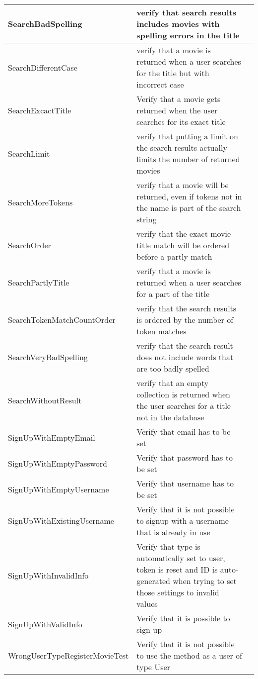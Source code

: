 \begin{centering}
\begin{longtable}{| p{5 cm} | p{7 cm} | c |}
\hline
SearchBadSpelling & verify that search results includes movies with spelling errors in the title & \\
\hline
SearchDifferentCase & verify that a movie is returned when a user searches for the title but with incorrect case & \\
\hline
SearchExcactTitle & Verify that a movie gets returned when the user searches for its exact title & \\
\hline
SearchLimit & verify that putting a limit on the search results actually limits the number of returned movies & \\
\hline
SearchMoreTokens & verify that a movie will be returned, even if tokens not in the name is part of the search string & \\
\hline
SearchOrder & verify that the exact movie title match will be ordered before a partly match & \\
\hline
SearchPartlyTitle & verify that a movie is returned when a user searches for a part of the title & \\
\hline
SearchTokenMatchCountOrder & verify that the search results is ordered by the number of token matches & \\
\hline
SearchVeryBadSpelling & verify that the search result does not include words that are too badly spelled & \\
\hline
SearchWithoutResult & verify that an empty collection is returned when the user searches for a title not in the database & \\
\hline
SignUpWithEmptyEmail & Verify that email has to be set & \\
\hline
SignUpWithEmptyPassword & Verify that password has to be set & \\
\hline
SignUpWithEmptyUsername & Verify that username has to be set & \\
\hline
SignUpWithExistingUsername & Verify that it is not possible to signup with a username that is already in use & \\
\hline
SignUpWithInvalidInfo & Verify that type is automatically set to user, token is reset and ID is auto-generated when trying to set those settings to invalid values & \\
\hline
SignUpWithValidInfo & Verify that it is possible to sign up & \\
\hline
WrongUserTypeRegisterMovieTest & Verify that it is not possible to use the method as a user of type User & \\
\hline
\end{longtable}
\end{centering}
